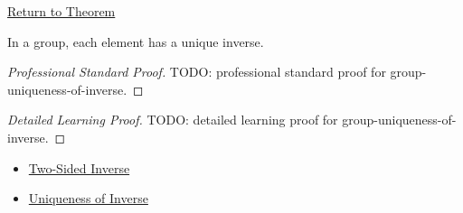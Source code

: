 \newpage
{}
\label{prf:group-uniqueness-of-inverse}

\begin{remark*}[Return]
\hyperref[thm:group-uniqueness-of-inverse]{Return to Theorem}
\end{remark*}

\begin{theorem*}
In a group, each element has a unique inverse.
\end{theorem*}

\begin{proof}[Professional Standard Proof]
\LRAProofBodyStart
TODO: professional standard proof for group-uniqueness-of-inverse.
\end{proof}

\begin{proof}[Detailed Learning Proof]
\LRAProofBodyStart
TODO: detailed learning proof for group-uniqueness-of-inverse.
\end{proof}

\begin{remark*}
\end{remark*}

\begin{dependencies}
\begin{itemize}
  \item \hyperref[def:two-sided-inverse]{Two-Sided Inverse}
  \item \hyperref[thm:uniqueness-of-inverse]{Uniqueness of Inverse}
\end{itemize}
\end{dependencies}

\clearpage
